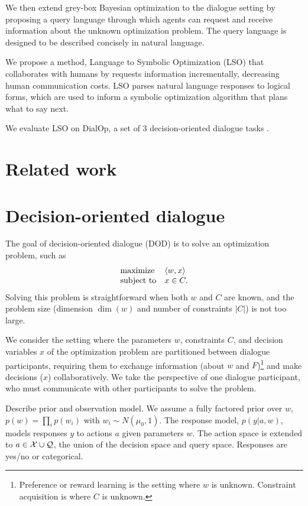 \documentclass[11pt]{article}
\begin{document}
We then extend grey-box Bayesian optimization to the dialogue setting by proposing a query language through which agents can request and receive information about the unknown optimization problem.
The query language is designed to be described concisely in natural language.

We propose a method, Language to Symbolic Optimization (LSO) that collaborates with humans by requests information incrementally, decreasing human communication costs.
LSO parses natural language responses to logical forms, which are used to inform a symbolic optimization algorithm that plans what to say next.

We evaluate LSO on DialOp, a set of 3 decision-oriented dialogue tasks \citep{lin2023decision}.

\section{Related work}

\section{Decision-oriented dialogue}
The goal of decision-oriented dialogue (DOD) is to solve an optimization problem, such as
\begin{equation}
\label{eqn:obj}
\begin{array}{ll}
\mbox{maximize} & \left\langle w,x\right\rangle\\
\mbox{subject to} & x \in C.
\end{array}
\end{equation}
Solving this problem is straightforward when both $w$ and $C$ are known,
and the problem size (dimension $\dim(w)$ and number of constraints $|C|$) is not too large.

We consider the setting where the parameters $w$, constraints $C$, and decision variables $x$ of the optimization problem are partitioned between dialogue participants, requiring them to exchange information (about $w$ and $F$)\footnote{Preference or reward learning is the setting where $w$ is unknown. Constraint acquisition is where $C$ is unknown.} and make decisions  ($x$) collaboratively.
We take the perspective of one dialogue participant, who must communicate with other participants to solve the problem.

Describe prior and observation model.
We assume a fully factored prior over $w$, $p(w) = \prod_i p(w_i)$ with $w_i\sim N(\mu_0,1)$.
The response model, $p(y | a,w)$, models responses $y$ to actions $a$ given parameters $w$.
The action space is extended to $a \in \mathcal{X} \cup \mathcal{Q}$, the union of the decision space and query space.
Responses are yes/no or categorical.
\end{document}
